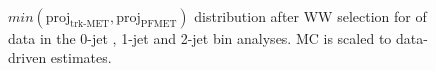 \begin{figure}[!hbtp]
\centering
{}
\\
\caption{$min(\text{proj}_\text{trk-MET}, \text{proj}_\text{PFMET})$ distribution after WW selection for \intlumi of data in the 0-jet , 
1-jet  and 2-jet  bin analyses. 
MC is scaled to data-driven estimates.}
\label{fig:ww_pmet}
\end{figure}

